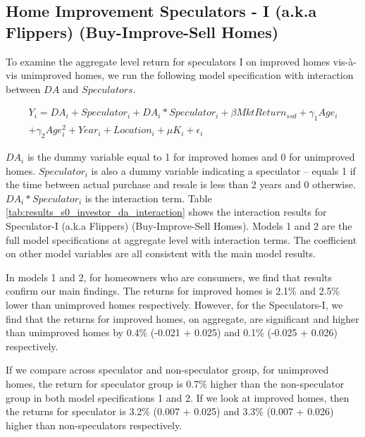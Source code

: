 \documentclass[AEJ,reqno, draftmode]{AEA} %
\begin{document}
\subsection{Home Improvement Speculators - I (a.k.a Flippers) (Buy-Improve-Sell Homes)}

To examine the aggregate level return for speculators I on improved homes vis-à-vis unimproved homes, we run the following model specification with interaction between $DA$ and $Speculators$. 

\begin{equation} \label{eq: spec I}
\begin{aligned}
    Y_i = DA_i + Speculator_i + DA_i * Speculator_i + \beta{MktReturn_{ssd}} + \gamma_1{Age_i}\\ + \gamma_2{Age_i^2} + Year_i + Location_i + \mu{K_i} + \epsilon_i
\end{aligned}
\end{equation}

$DA_i$ is the dummy variable equal to 1 for improved homes and 0 for unimproved homes. $Speculator_i$ is also a dummy variable indicating a speculator -- equals 1 if the time between actual purchase and resale is less than 2 years and 0 otherwise. $DA_i*Speculator_i$ is the interaction term. Table \ref{tab:results_s0_investor_da_interaction} shows the interaction results for Speculator-I (a.k.a Flippers) (Buy-Improve-Sell Homes). Models 1 and 2 are the full model specifications at aggregate level with interaction terms. The coefficient on other model variables are all consistent with the main model results.

In models 1 and 2, for homeowners who are consumers, we find that results confirm our main findings. The returns for improved homes is 2.1\% and 2.5\% lower than unimproved homes respectively. However, for the Speculators-I, we find that the returns for improved homes, on aggregate, are significant and higher than unimproved homes by 0.4\% (-0.021 + 0.025) and 0.1\% (-0.025 + 0.026) respectively.



\restoregeometry


If we compare across speculator and non-speculator group, for unimproved homes, the return for speculator group is 0.7\% higher than the non-speculator group in both model specifications 1 and 2. If we look at improved homes, then the returns for speculator is 3.2\% (0.007 + 0.025) and 3.3\% (0.007 + 0.026) higher than non-speculators respectively.
\end{document}
